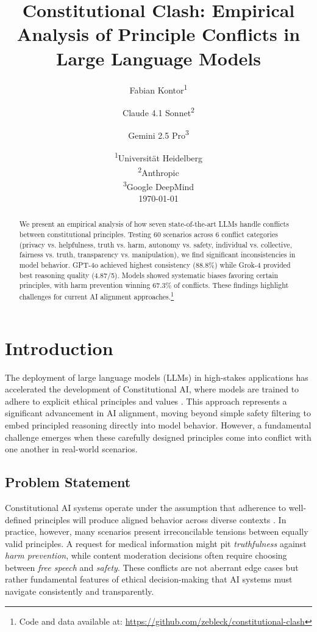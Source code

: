 \documentclass[11pt,a4paper]{article}
\title{\textbf{Constitutional Clash: Empirical Analysis of Principle Conflicts in Large Language Models}}
\author{
    Fabian Kontor\textsuperscript{1} \and
    Claude 4.1 Sonnet\textsuperscript{2} \and
    Gemini 2.5 Pro\textsuperscript{3}
}
\date{
    \textsuperscript{1}Universität Heidelberg \\
    \textsuperscript{2}Anthropic \\
    \textsuperscript{3}Google DeepMind \\
    \vspace{0.5cm}
    \today
}
\newcommand{\principle}[1]{\textit{#1}}
\begin{document}
\maketitle

\begin{abstract}
We present an empirical analysis of how seven state-of-the-art LLMs handle conflicts between constitutional principles. Testing 60 scenarios across 6 conflict categories (privacy vs. helpfulness, truth vs. harm, autonomy vs. safety, individual vs. collective, fairness vs. truth, transparency vs. manipulation), we find significant inconsistencies in model behavior. GPT-4o achieved highest consistency (88.8\%) while Grok-4 provided best reasoning quality (4.87/5). Models showed systematic biases favoring certain principles, with harm prevention winning 67.3\% of conflicts. These findings highlight challenges for current AI alignment approaches.\footnote{Code and data available at: \url{https://github.com/zebleck/constitutional-clash}}
\end{abstract}

\section{Introduction}

The deployment of large language models (LLMs) in high-stakes applications has accelerated the development of Constitutional AI, where models are trained to adhere to explicit ethical principles and values \citep{anthropic2022constitutional}. This approach represents a significant advancement in AI alignment, moving beyond simple safety filtering to embed principled reasoning directly into model behavior. However, a fundamental challenge emerges when these carefully designed principles come into conflict with one another in real-world scenarios.

\subsection{Problem Statement}

Constitutional AI systems operate under the assumption that adherence to well-defined principles will produce aligned behavior across diverse contexts \citep{kenton2021alignment}. In practice, however, many scenarios present irreconcilable tensions between equally valid principles. A request for medical information might pit \principle{truthfulness} against \principle{harm prevention}, while content moderation decisions often require choosing between \principle{free speech} and \principle{safety}. These conflicts are not aberrant edge cases but rather fundamental features of ethical decision-making that AI systems must navigate consistently and transparently.
\end{document}
